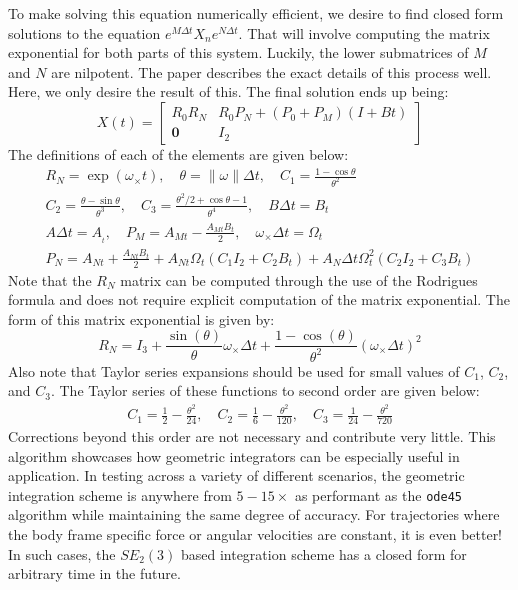 To make solving this equation numerically efficient, we desire to find closed form solutions to the equation $e^{M\Delta t}X_ne^{N\Delta t}$. That will involve computing the matrix exponential for both parts of this system. Luckily, the lower submatrices of $M$ and $N$ are nilpotent. The paper describes the exact details of this process well. Here, we only desire the result of this. The final solution ends up being:
$$X(t)=\begin{bmatrix}
    R_0R_N&R_0P_N+(P_0+P_M)(I+Bt)\\\bm{0}&I_2
\end{bmatrix}$$
The definitions of each of the elements are given below:
\begin{gather}
    R_N=\exp(\omega_\times t),\quad\theta=\|\omega\|\Delta t ,\quad  C_1=\frac{1-\cos\theta}{\theta^2} \\
 C_2=\frac{\theta-\sin\theta}{\theta^3},\quad C_3=\frac{\theta^2/2+\cos\theta-1}{\theta^4},\quad B\Delta t = B_t\\
 A\Delta t=A_{_t},\quad P_M=A_{Mt}-\frac{A_{Mt} B_t}{2},\quad \omega_\times \Delta t=\Omega_t\\
 P_N=A_{Nt} + \frac{A_{Nt}B_t}{2}+A_{Nt}\Omega_t(C_1I_2+C_2B_t)+A_N \Delta t\Omega_t^2(C_2I_2+C_3B_t)
\end{gather}
Note that the $R_N$ matrix can be computed through the use of the Rodrigues formula and does not require explicit computation of the matrix exponential. The form of this matrix exponential is given by:
$$R_N=I_3+\frac{\sin(\theta)}{\theta}\omega_\times \Delta t + \frac{1-\cos(\theta)}{\theta^2}(\omega_\times\Delta t)^2$$
Also note that Taylor series expansions should be used for small values of $C_1$, $C_2$, and $C_3$. The Taylor series of these functions to second order are given below:
\begin{gather}
C_1=\frac{1}{2}-\frac{\theta^2}{24},\quad C_2=\frac{1}{6}-\frac{\theta^2}{120},\quad C_3=\frac{1}{24}-\frac{\theta^2}{720}
\end{gather}
Corrections beyond this order are not necessary and contribute very little. This algorithm showcases how geometric integrators can be especially useful in application. In testing across a variety of different scenarios, the geometric integration scheme is anywhere from $5-15\times$ as performant as the \texttt{ode45} algorithm while maintaining the same degree of accuracy. For trajectories where the body frame specific force or angular velocities are constant, it is even better! In such cases, the $SE_2(3)$ based integration scheme has a closed form for arbitrary time in the future. 

